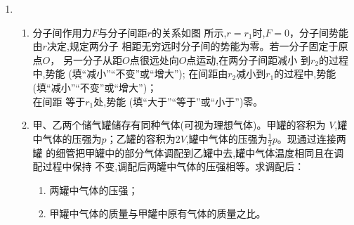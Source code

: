 \begin{enumerate}
\begin{enumerate}
\end{enumerate}
\begin{figure}[h!]
\flushright

\end{figure}








\newpage
{}



\item 
\begin{enumerate}
\item
分子间作用力$ F $与分子间距$ r $的关系如图
所示,$ r=r_{1} $时,$ F=0 $，分子间势能由$ r $决定,规定两分子
相距无穷远时分子间的势能为零。若一分子固定于原点$ O $，
另一分子从距$ O $点很远处向$ O $点运动,在两分子间距减小
到$ r_{2} $的过程中,势能 \underlinegap (填“减小”“不变”或“增大”);
在间距由$ r_{2} $减小到$ r_{1} $的过程中,势能 \hfullline (填“减小”“不变”或“增大”)；\\
在间距
等于$ r_{1} $处,势能 \underlinegap (填“大于”“等于”或“小于”)零。

\begin{figure}[h!]
\centering

\end{figure}




\item 
甲、乙两个储气罐储存有同种气体(可视为理想气体)。甲罐的容积为
$ V $,罐中气体的压强为$ p$；乙罐的容积为$ 2 V $,罐中气体的压强为$ \frac{ 1 }{ 2 } p $。现通过连接两罐
的细管把甲罐中的部分气体调配到乙罐中去,罐中气体温度相同且在调配过程中保持
不变,调配后两罐中气体的压强相等。求调配后：
\begin{enumerate}
\item
两罐中气体的压强；
\item 
甲罐中气体的质量与甲罐中原有气体的质量之比。
\end{enumerate}









\end{enumerate}
\end{enumerate}

